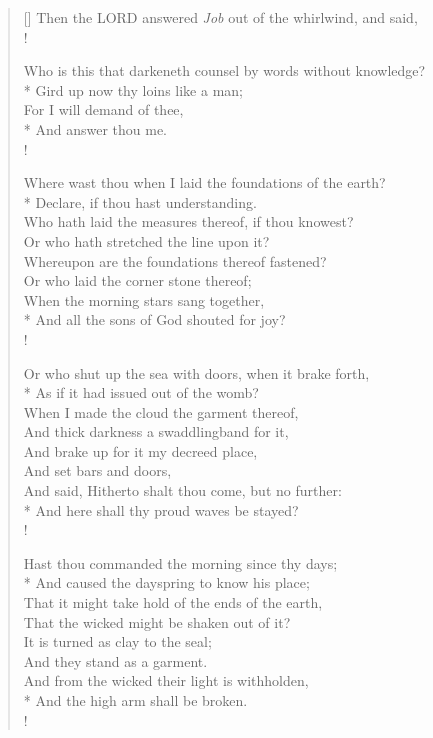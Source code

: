 \documentclass[MAIN]{subfiles}
\begin{document}
\settowidth{\versewidth}{Where wast thou when I laid the foundations of the earth?}
\begin{verse}[\versewidth]
Then the {\hge LORD} answered \emph{Job} out of the whirlwind, and said,\\!

Who is this that darkeneth counsel by words without knowledge?\\*
\vin Gird up now thy loins like a man;\\
For I will demand of thee,\\*
\vin And answer thou me.\\!

Where wast thou when I laid the foundations of the earth?\\*
\vin Declare, if thou hast understanding.\\
Who hath laid the measures thereof, if thou knowest?\\
\vin Or who hath stretched the line upon it?\\
Whereupon are the foundations thereof fastened?\\
\vin Or who laid the corner stone thereof;\\
When the morning stars sang together,\\*
\vin And all the sons of God shouted for joy?\\!

Or who shut up the sea with doors, when it brake forth,\\*
\vin As if it had issued out of the womb?\\
When I made the cloud the garment thereof,\\
\vin And thick darkness a swaddlingband for it,\\
And brake up for it my decreed place,\\
\vin And set bars and doors,\\
And said, Hitherto shalt thou come, but no further:\\*
\vin And here shall thy proud waves be stayed?\\!

Hast thou commanded the morning since thy days;\\*
\vin And caused the dayspring to know his place;\\
That it might take hold of the ends of the earth,\\
\vin That the wicked might be shaken out of it?\\
It is turned as clay to the seal;\\
\vin And they stand as a garment.\\
And from the wicked their light is withholden,\\*
\vin And the high arm shall be broken.\\!


\end{verse}
\end{document}

